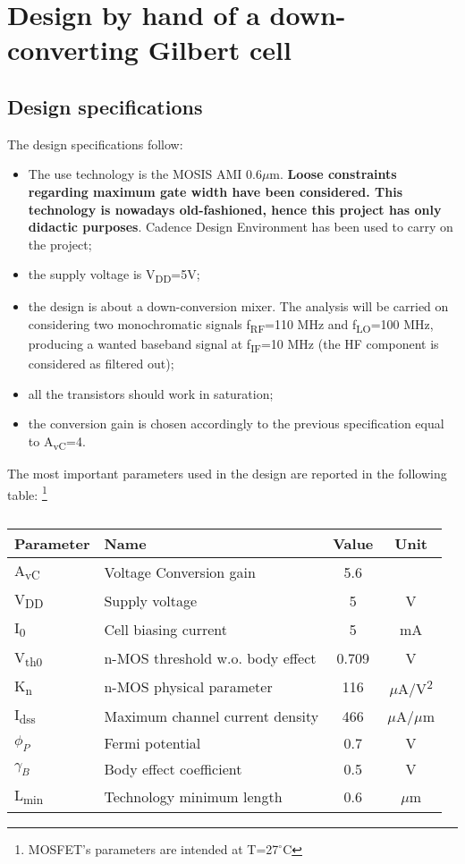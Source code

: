 \newpage
\thispagestyle{empty}
\clearpage\mbox{}\clearpage
\section{Design by hand of a down-converting Gilbert cell}

\subsection{Design specifications}
The design specifications follow:
\begin{itemize}
	\item The use technology is the MOSIS AMI 0.6$\mu$m. \textbf{Loose constraints regarding maximum gate width have been considered. This technology is nowadays  old-fashioned, hence this project has only didactic purposes}. Cadence Design Environment has been used to carry on the project;
	\item the supply voltage is V\textsubscript{DD}=5V;
	\item the design is about a down-conversion mixer. The analysis will be carried on considering two monochromatic signals f\textsubscript{RF}=110 MHz and f\textsubscript{LO}=100 MHz, producing a wanted baseband signal at f\textsubscript{IF}=10 MHz (the HF component is considered as filtered out);
	\item all the transistors should work in saturation;
	\item the conversion gain is chosen accordingly to the previous specification equal to A\textsubscript{vC}=4.
\end{itemize}
The most important parameters used in the design are reported in the following table: \footnote{MOSFET's parameters are intended at T=27$^\circ$C}
\begin{table} [h]
	\label{tab:specs}
	\caption{}
	\centering	
	\begin{tabular}{llcc} 
		\toprule 
		Parameter & Name			& Value 	& Unit \\ 
		\midrule
		A\textsubscript{vC} & Voltage Conversion gain & 5.6 & \\
		V\textsubscript{DD} & Supply voltage &	5 & V		\\
		I\textsubscript{0} & Cell biasing current & 5 & mA \\
		V\textsubscript{th0} & n-MOS threshold w.o. body effect& 0.709 &V		\\ 
		K\textsubscript{n} & n-MOS physical parameter& 116 & $\mu$A/V\textsuperscript{2}\\
		I\textsubscript{dss} & Maximum channel current density & 466 & $\mu$A/$\mu$m \\
		$\phi_P$ & Fermi potential & 0.7 & V \\
		$\gamma_B$ & Body effect coefficient & 0.5 & V \\
		L\textsubscript{min} & Technology minimum length & 0.6 & $\mu$m \\
		\bottomrule 
	\end{tabular}	
\end{table}


